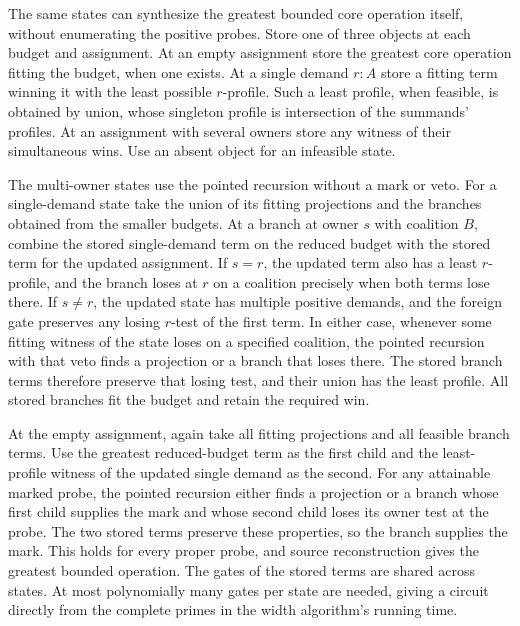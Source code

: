 The same states can synthesize the greatest bounded
core operation itself, without enumerating the
positive probes. Store one of three objects at each
budget and assignment. At an empty assignment store
the greatest core operation fitting the budget, when
one exists. At a single demand $r:A$ store a fitting
term winning it with the least possible $r$-profile.
Such a least profile, when feasible, is obtained by
union, whose singleton profile is intersection of
the summands' profiles. At an assignment with several
owners store any witness of their simultaneous wins.
Use an absent object for an infeasible state.

The multi-owner states use the pointed recursion
without a mark or veto. For a single-demand state
take the union of its fitting projections and the
branches obtained from the smaller budgets. At a
branch at owner $s$ with coalition $B$, combine the
stored single-demand term on the reduced budget with
the stored term for the updated assignment. If $s=r$,
the updated term also has a least $r$-profile, and
the branch loses at $r$ on a coalition precisely when
both terms lose there. If $s\ne r$, the updated state
has multiple positive demands, and the foreign gate
preserves any losing $r$-test of the first term.
In either case, whenever some fitting witness of the
state loses on a specified coalition, the pointed
recursion with that veto finds a projection or a
branch that loses there. The stored branch terms
therefore preserve that losing test, and their union
has the least profile. All stored branches fit the
budget and retain the required win.

At the empty assignment, again take all fitting
projections and all feasible branch terms. Use the
greatest reduced-budget term as the first child and
the least-profile witness of the updated single
demand as the second. For any attainable marked
probe, the pointed recursion either finds a projection
or a branch whose first child supplies the mark and
whose second child loses its owner test at the probe.
The two stored terms preserve these properties, so
the branch supplies the mark. This holds for every
proper probe, and source reconstruction gives the
greatest bounded operation. The gates of the stored
terms are shared across states. At most polynomially
many gates per state are needed, giving a circuit
directly from the complete primes in the width
algorithm's running time.

